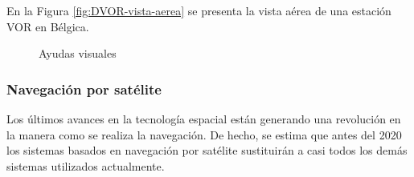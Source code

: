 \documentclass[a4paper,12pt,twoside]{article}
\begin{document}
En la Figura \ref{fig:DVOR-vista-aerea} se presenta la vista a\'erea de una estaci\'on VOR en B\'elgica. 



\begin{figure}[!h]
  \centering


\caption{Ayudas visuales}
\end{figure}




\subsubsection{Navegaci\'on por sat\'elite}

Los \'ultimos avances en la tecnolog\'ia espacial est\'an generando una revoluci\'on en la manera como se realiza la navegaci\'on. De hecho, se estima que antes del 2020 los sistemas basados en navegaci\'on por sat\'elite sustituir\'an a casi todos los dem\'as sistemas utilizados actualmente.
\end{document}
